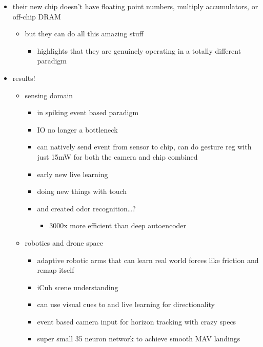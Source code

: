\documentclass[letterpaper]{article}
\begin{document}
\begin{itemize}
\item their new chip doesn't have floating point numbers, multiply
accumulators, or off-chip DRAM

\begin{itemize}
\item but they can do all this amazing stuff

\begin{itemize}
\item highlights that they are genuinely operating in a totally
different paradigm
\end{itemize}
\end{itemize}

\item results!

\begin{itemize}
\item sensing domain

\begin{itemize}
\item in spiking event based paradigm
\item IO no longer a bottleneck
\item can natively send event from sensor to chip, can do gesture reg
with just 15mW for both the camera and chip combined
\item early new live learning
\item doing new things with touch
\item and created odor recognition\ldots{}?

\begin{itemize}
\item 3000x more efficient than deep autoencoder
\end{itemize}
\end{itemize}

\item robotics and drone space

\begin{itemize}
\item adaptive robotic arms that can learn real world forces like
friction and remap itself
\item iCub scene understanding
\item can use visual cues to and live learning for directionality
\item event based camera input for horizon tracking with crazy specs
\item super small 35 neuron network to achieve smooth MAV landings


\end{itemize}
\end{itemize}
\end{itemize}
\end{document}
